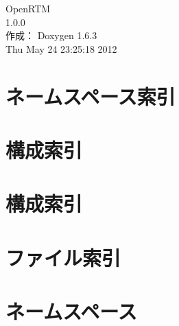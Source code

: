 \documentclass[a4paper]{book}
\begin{document}
\begin{titlepage}
\vspace*{7cm}
\begin{center}
{\Large OpenRTM \\[1ex]\large 1.0.0 }\\
\vspace*{1cm}
{\large 作成： Doxygen 1.6.3}\\
\vspace*{0.5cm}
{\small Thu May 24 23:25:18 2012}\\
\end{center}
\end{titlepage}
\clearemptydoublepage
{}
\tableofcontents
\clearemptydoublepage
{}
\chapter{ネームスペース索引}

\chapter{構成索引}

\chapter{構成索引}

\chapter{ファイル索引}

\chapter{ネームスペース}









\end{document}
